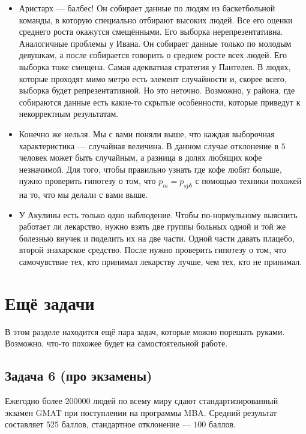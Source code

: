 \documentclass[12pt, a4paper, oneside]{article}
\begin{document}
\begin{itemize}
	\item  Аристарх --- балбес! Он собирает данные по людям из баскетбольной команды, в которую специально отбирают высоких людей. Все его оценки среднего роста окажутся смещёнными. Его выборка нерепрезентативна.  Аналогичные проблемы у Ивана. Он собирает данные только по молодым девушкам, а после собирается говорить о среднем росте всех людей. Его выборка тоже смещена. Самая адекватная стратегия у Пантелея. В людях, которые проходят мимо метро есть элемент случайности и, скорее всего, выборка будет репрезентативной. Но это неточно. Возможно, у района, где собираются данные есть какие-то скрытые особенности, которые приведут к некорректным результатам. 
	
	\item Конечно же нельзя. Мы с вами поняли выше, что каждая выборочная характеристика --- случайная величина. В данном случае отклонение в $5$ человек может быть случайным, а разница в долях любящих кофе незначимой. Для того, чтобы правильно узнать где кофе любят больше, нужно проверить гипотезу о том, что $p_{m} = p_{spb}$ с помощью техники похожей на то, что мы делали с вами выше. 
	
	\item У Акулины есть только одно наблюдение. Чтобы по-нормульному выяснить работает ли лекарство, нужно взять  две группы больных одной и той же болезнью внучек и поделить их на две части. Одной части давать плацебо, второй знахарское средство. После нужно проверить гипотезу о том, что самочувствие тех, кто принимал лекарству лучше, чем тех, кто не принимал. 
\end{itemize}


\section*{Ещё задачи}

В этом разделе находится ещё пара задач, которые можно порешать руками. Возможно, что-то похожее будет на самостоятельной работе. 

\subsection*{Задача 6 (про экзамены)} 

Ежегодно более  $200000$  людей по всему миру сдают стандартизированный экзамен GMAT при поступлении на программы MBA. Средний результат составляет  $525$  баллов, стандартное отклонение —  $100$  баллов.
\end{document}
